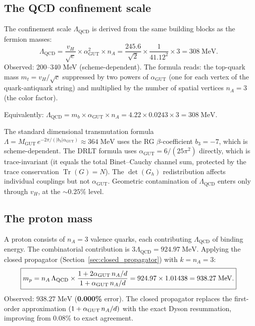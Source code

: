 \subsection{The QCD confinement scale}

The confinement scale $\Lambda_\text{QCD}$ is derived from the same building blocks as the fermion masses:
\begin{equation}
\boxed{\Lambda_\text{QCD} = \frac{v_H}{\sqrt{c}} \times \alpha_\text{GUT}^2 \times n_A = \frac{245.6}{\sqrt{2}} \times \frac{1}{41.12^2} \times 3 = 308\;\text{MeV}.}
\end{equation}
Observed: 200--340 MeV (scheme-dependent). The formula reads: the top-quark mass $m_t = v_H/\sqrt{c}$ suppressed by two powers of $\alpha_\text{GUT}$ (one for each vertex of the quark-antiquark string) and multiplied by the number of spatial vertices $n_A = 3$ (the color factor).

Equivalently: $\Lambda_\text{QCD} = m_b \times \alpha_\text{GUT} \times n_A = 4.22 \times 0.0243 \times 3 = 308\;\text{MeV}$.

\begin{remark}
The standard dimensional transmutation formula $\Lambda = M_\text{GUT}\,e^{-2\pi/(|b_3|\alpha_\text{GUT})} \approx 364\;\text{MeV}$ uses the RG $\beta$-coefficient $b_3 = -7$, which is scheme-dependent. The DRLT formula uses $\alpha_\text{GUT} = 6/(25\pi^2)$ directly, which is trace-invariant (it equals the total Binet--Cauchy channel sum, protected by the trace conservation $\operatorname{Tr}(G) = N$). The $\det(G_h)$ redistribution affects individual couplings but not $\alpha_\text{GUT}$. Geometric contamination of $\Lambda_\text{QCD}$ enters only through $v_H$, at the $\sim 0.25\%$ level.
\end{remark}

\subsection{The proton mass}

A proton consists of $n_A = 3$ valence quarks, each contributing $\Lambda_\text{QCD}$ of binding energy. The combinatorial contribution is $3\Lambda_\text{QCD} = 924.97\;\text{MeV}$. Applying the closed propagator (Section~\ref{sec:closed_propagator}) with $k = n_A = 3$:
\begin{equation}
\boxed{m_p = n_A \,\Lambda_\text{QCD} \times \frac{1 + 2\alpha_{\mathrm{GUT}}\,n_A/d}{1 + \alpha_{\mathrm{GUT}}\,n_A/d} = 924.97 \times 1.01438 = 938.27\;\text{MeV}.}
\end{equation}
Observed: $938.27\;\text{MeV}$ (\textbf{0.000\%} error). The closed propagator replaces the first-order approximation $(1 + \alpha_{\mathrm{GUT}}\,n_A/d)$ with the exact Dyson resummation, improving from 0.08\% to exact agreement.


